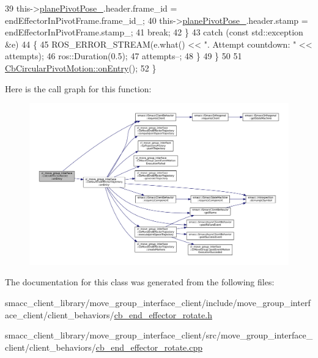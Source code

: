 \begin{DoxyCode}
39                 this->\hyperlink{classcl__move__group__interface_1_1CbCircularPivotMotion_a0994efbe93b9f9a61fcf3703c360cda2}{planePivotPose\_}.header.frame\_id = endEffectorInPivotFrame.frame\_id\_;
40                 this->\hyperlink{classcl__move__group__interface_1_1CbCircularPivotMotion_a0994efbe93b9f9a61fcf3703c360cda2}{planePivotPose\_}.header.stamp = endEffectorInPivotFrame.stamp\_;
41                 \textcolor{keywordflow}{break};
42             \}
43             \textcolor{keywordflow}{catch} (\textcolor{keyword}{const} std::exception &e)
44             \{
45                 ROS\_ERROR\_STREAM(e.what() << \textcolor{stringliteral}{". Attempt countdown: "} << attempts);
46                 ros::Duration(0.5);
47                 attempts--;
48             \}
49         \}
50 
51         \hyperlink{classcl__move__group__interface_1_1CbMoveEndEffectorTrajectory_aaedd074fd178c6390a4a3f1ccff23ad3}{CbCircularPivotMotion::onEntry}();
52     \}
\end{DoxyCode}
Here is the call graph for this function\+:
\nopagebreak
\begin{figure}[H]
\begin{center}
\leavevmode
\includegraphics[width=350pt]{classcl__move__group__interface_1_1CbEndEffectorRotate_a3e60bfba48906696587d66af89f7ee2b_cgraph}
\end{center}
\end{figure}


The documentation for this class was generated from the following files\+:\begin{DoxyCompactItemize}
\item 
smacc\+\_\+client\+\_\+library/move\+\_\+group\+\_\+interface\+\_\+client/include/move\+\_\+group\+\_\+interface\+\_\+client/client\+\_\+behaviors/\hyperlink{cb__end__effector__rotate_8h}{cb\+\_\+end\+\_\+effector\+\_\+rotate.\+h}\item 
smacc\+\_\+client\+\_\+library/move\+\_\+group\+\_\+interface\+\_\+client/src/move\+\_\+group\+\_\+interface\+\_\+client/client\+\_\+behaviors/\hyperlink{cb__end__effector__rotate_8cpp}{cb\+\_\+end\+\_\+effector\+\_\+rotate.\+cpp}\end{DoxyCompactItemize}
